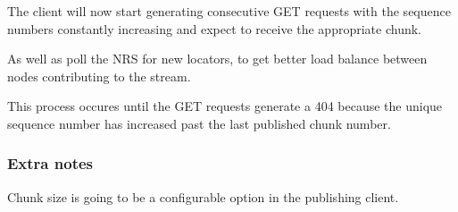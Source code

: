 The client will now start generating consecutive GET requests with the sequence numbers constantly increasing and expect to receive the appropriate chunk.

As well as  poll the NRS for new locators, to get better load balance between nodes contributing to the stream.

This process occures until the GET requests generate a 404 because the unique sequence number has increased past the last published chunk number.

\subsubsection{Extra notes}

Chunk size is going to be a configurable option in the publishing client.
